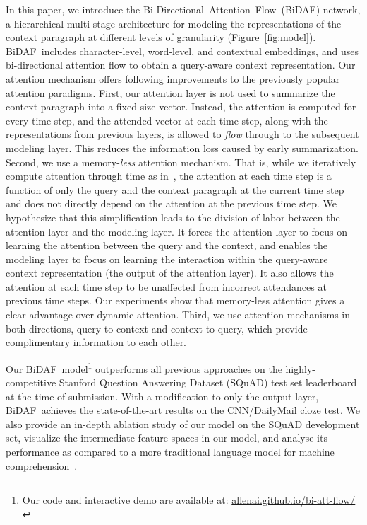 \documentclass{article} \usepackage{iclr2017_conference,times}
\newcommand{\sys}{\mbox{Bi-Directional Attention Flow}}
\newcommand{\sysshort}{\mbox{\sc BiDAF}}
\begin{document}
In this paper, we introduce the \sys\  (\sysshort) network, a hierarchical multi-stage architecture for modeling the representations of the context paragraph at different levels of granularity (Figure~\ref{fig:model}). 
\sysshort\ includes character-level, word-level, and contextual embeddings, and uses bi-directional attention flow to obtain a query-aware context representation. 
Our attention mechanism offers following improvements to the previously popular attention paradigms. 
First, our attention layer is not used to summarize the context paragraph into a fixed-size vector. 
Instead, the attention is computed for every time step, and the attended vector at each time step, along with the representations from previous layers, is allowed to \emph{flow} through to the subsequent modeling layer.
This reduces the information loss caused by early summarization. 
Second, we use a memory-\emph{less} attention mechanism.
That is, while we iteratively compute attention through time as in~\cite{Bahdanau2014NeuralMT}, the attention at each time step is a function of only the query and the context paragraph at the current time step and does not directly depend on the attention at the previous time step.
We hypothesize that this simplification leads to the division of labor between the attention layer and the modeling layer.
It forces the attention layer to focus on learning the attention between the query and the  context, and enables the modeling layer to focus on learning the interaction within the query-aware context representation (the output of the attention layer).
It also allows the attention at each time step to be unaffected from incorrect attendances at previous time steps. 
Our experiments show that memory-less attention gives a clear advantage over dynamic attention. 
Third, we use attention mechanisms in both directions, query-to-context and context-to-query, which provide complimentary information to each other.

Our \sysshort\ model\footnote{Our code and interactive demo are available at: \url{allenai.github.io/bi-att-flow/}}  outperforms all previous approaches on the highly-competitive Stanford Question Answering Dataset (SQuAD) test set leaderboard at the time of submission.
With a modification to only the output layer, \sysshort\ achieves the state-of-the-art results on the CNN/DailyMail cloze test. 
We also provide an in-depth ablation study of our model on the SQuAD development set, visualize the intermediate feature spaces in our model, and analyse its performance as compared to a more traditional language model for machine comprehension~\citep{rajpurkar2016squad}.
 
\end{document}
